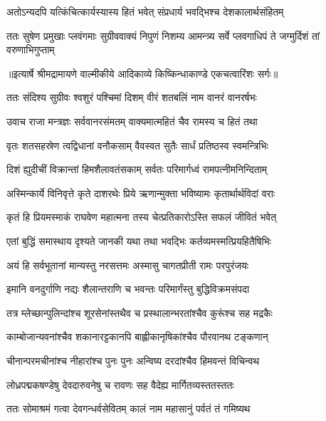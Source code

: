 \twolineshloka
{अतोऽन्यदपि यत्किंचित्कार्यस्यास्य हितं भवेत्}
{संप्रधार्य भवद्भिश्च देशकालार्थसंहितम्} %

\fourlineindentedshloka
{ततः सुषेण प्रमुखाः प्लवंगमाः}
{ सुग्रीववाक्यं निपुणं निशम्य}
{आमन्त्र्य सर्वे प्लवगाधिपं ते}
{ जग्मुर्दिशं तां वरुणाभिगुप्ताम्} %


{॥इत्यार्षे श्रीमद्रामायणे वाल्मीकीये आदिकाव्ये किष्किन्धाकाण्डे एकचत्वारिंशः सर्गः॥}


\twolineshloka
{ततः संदिश्य सुग्रीवः श्वशुरं पश्चिमां दिशम्}
{वीरं शतबलिं नाम वानरं वानरर्षभः} %

\twolineshloka
{उवाच राजा मन्त्रज्ञः सर्ववानरसंमतम्}
{वाक्यमात्महितं चैव रामस्य च हितं तथा} %

\twolineshloka
{वृतः शतसहस्रेण त्वद्विधानां वनौकसाम्}
{वैवस्वत सुतैः सार्धं प्रतिष्ठस्व स्वमन्त्रिभिः} %

\twolineshloka
{दिशं ह्युदीचीं विक्रान्तां हिमशैलावतंसकाम्}
{सर्वतः परिमार्गध्वं रामपत्नीमनिन्दिताम्} %

\twolineshloka
{अस्मिन्कार्ये विनिवृत्ते कृते दाशरथेः प्रिये}
{ऋणान्मुक्ता भविष्यामः कृतार्थार्थविदां वराः} %

\twolineshloka
{कृतं हि प्रियमस्माकं राघवेण महात्मना}
{तस्य चेत्प्रतिकारोऽस्ति सफलं जीवितं भवेत्} %

\twolineshloka
{एतां बुद्धिं समास्थाय दृश्यते जानकी यथा}
{तथा भवद्भिः कर्तव्यमस्मत्प्रियहितैषिभिः} %

\twolineshloka
{अयं हि सर्वभूतानां मान्यस्तु नरसत्तमः}
{अस्मासु चागतप्रीती रामः परपुरंजयः} %

\twolineshloka
{इमानि वनदुर्गाणि नद्यः शैलान्तराणि च}
{भवन्तः परिमार्गंस्तु बुद्धिविक्रमसंपदा} %

\twolineshloka
{तत्र म्लेच्छान्पुलिन्दांश्च शूरसेनांस्तथैव च}
{प्रस्थालान्भरतांश्चैव कुरूंश्च सह मद्रकैः} %

\twolineshloka
{काम्बोजान्यवनांश्चैव शकानारट्टकानपि}
{बाह्लीकानृषिकांश्चैव पौरवानथ टङ्कणान्} %

\twolineshloka
{चीनान्परमचीनांश्च नीहारांश्च पुनः पुनः}
{अन्विष्य दरदांश्चैव हिमवन्तं विचिन्वथ} %

\twolineshloka
{लोध्रपद्मकषण्डेषु देवदारुवनेषु च}
{रावणः सह वैदेह्य मार्गितव्यस्ततस्ततः} %

\twolineshloka
{ततः सोमाश्रमं गत्वा देवगन्धर्वसेवितम्}
{कालं नाम महासानुं पर्वतं तं गमिष्यथ} %

